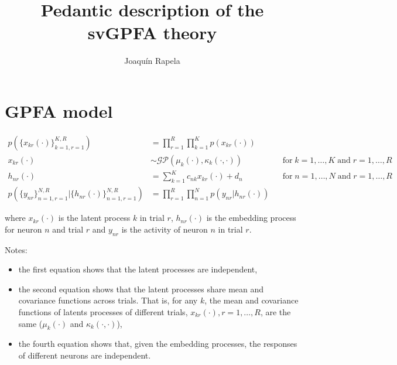 \documentclass[12pt]{article}
\title{Pedantic description of the svGPFA theory}
\author{Joaqu\'{i}n Rapela}
\begin{document}
\maketitle


\section{GPFA model}

\begin{equation}
    \begin{aligned}
        p(\{x_{kr}(\cdot)\}_{k=1,r=1}^{K,R}) &= \prod_{r=1}^R\prod_{k=1}^Kp(x_{kr}(\cdot))\\
        x_{kr}(\cdot) &\sim \mathcal{GP}(\mu_k(\cdot),\kappa_k(\cdot,\cdot))&&{\text{for}\; k=1, \ldots, K\;\text{and}\;r=1,\ldots, R}\\
        h_{nr}(\cdot) &= \sum_{k=1}^Kc_{nk}x_{kr}(\cdot) + d_n&&{\text{for}\; n=1, \ldots, N\;\text{and}\;r=1,\ldots, R}\\
        p(\{y_{nr}\}_{n=1,r=1}^{N,R}|\{h_{nr}(\cdot)\}_{n=1,r=1}^{N,R}) &= \prod_{r=1}^R\prod_{n=1}^Np(y_{nr}|h_{nr}(\cdot))
    \end{aligned}
    \label{eq:gpfaModel}
\end{equation}

\noindent where $x_{kr}(\cdot)$ is the latent process $k$ in trial $r$, $h_{nr}(\cdot)$ is the embedding process for neuron $n$ and trial $r$ and $y_{nr}$ is the activity of neuron $n$ in trial $r$.

Notes:

\begin{itemize}

    \item the first equation shows that the latent processes are independent,

    \item the second equation shows that the latent processes share mean and
        covariance functions across trials. That is, for any $k$, the mean and
        covariance functions  of latents processes of different trials,
        $x_{kr}(\cdot), r=1,\ldots, R$, are the same ($\mu_k(\cdot)$ and
        $\kappa_k(\cdot,\cdot)$),

    \item the fourth equation shows that, given the embedding processes, the
        responses of different neurons are independent.

\end{itemize}
\end{document}

